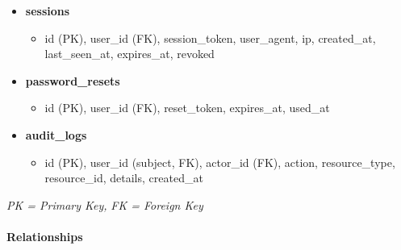 \documentclass[]{VUMIFTemplateClass}
\begin{document}
\begin{itemize}
\begin{itemize}
    \end{itemize}
    \item \textbf{sessions}  
    \begin{itemize}
        \item id (PK), user\_id (FK), session\_token, user\_agent, ip, created\_at, last\_seen\_at, expires\_at, revoked
    \end{itemize}
    \item \textbf{password\_resets}  
    \begin{itemize}
        \item id (PK), user\_id (FK), reset\_token, expires\_at, used\_at
    \end{itemize}
    \item \textbf{audit\_logs}  
    \begin{itemize}
        \item id (PK), user\_id (subject, FK), actor\_id (FK), action, resource\_type, resource\_id, details, created\_at
    \end{itemize}
\end{itemize}

\textit{PK = Primary Key,}
\textit{FK = Foreign Key}

\paragraph{Relationships}
\end{document}
